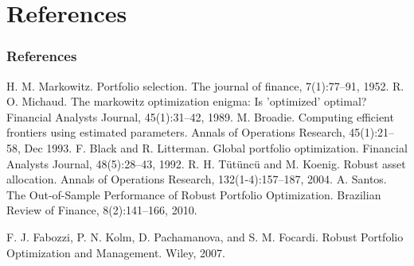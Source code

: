 \documentclass{beamer}
\begin{document}







\section{References}

\begin{frame}
\frametitle{References}
\footnotesize{
\begin{thebibliography}{99} %
 H. M. Markowitz. Portfolio selection. The journal of finance, 7(1):77–91,
1952.
 R. O. Michaud. The markowitz optimization enigma: Is ’optimized’ optimal? Financial Analysts Journal, 45(1):31–42, 1989.
 M. Broadie. Computing efficient frontiers using estimated parameters. Annals of Operations Research, 45(1):21–58, Dec 1993.
 F. Black and R. Litterman. Global portfolio optimization. Financial Analysts Journal, 48(5):28–43, 1992.
 R. H. T{\"u}t{\"u}nc{\"u} and M. Koenig. Robust asset allocation. Annals of Operations Research, 132(1-4):157–187, 2004.
 A. Santos. The Out-of-Sample Performance of Robust Portfolio Optimization. Brazilian Review of Finance, 8(2):141--166, 2010.

 F. J. Fabozzi, P. N. Kolm, D. Pachamanova, and S. M. Focardi. Robust Portfolio Optimization and Management. Wiley, 2007.
\end{thebibliography}
}
\end{frame}
\end{document}
